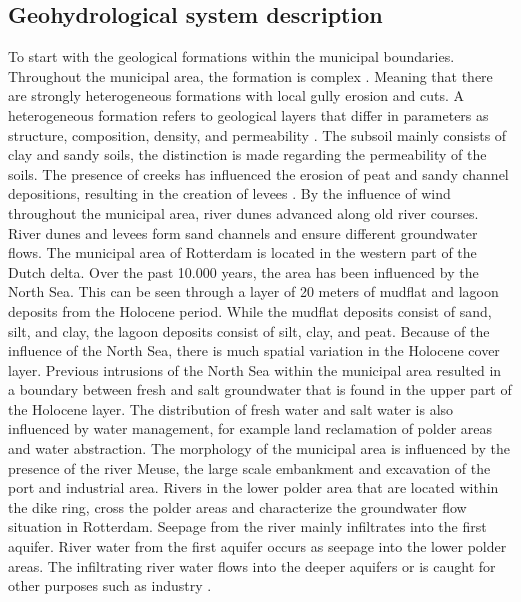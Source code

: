 \subsection{Geohydrological system description}
To start with the geological formations within the municipal boundaries. Throughout the municipal area, the formation is complex \cite{valstar-2019}. Meaning that there are strongly heterogeneous formations with local gully erosion and cuts. A heterogeneous formation refers to geological layers that differ in parameters as structure, composition, density, and permeability \cite{valstar-2019}. The subsoil mainly consists of clay and sandy soils, the distinction is made regarding the permeability of the soils. The presence of creeks has influenced the erosion of peat and sandy channel depositions, resulting in the creation of levees \cite{janssen-2005}. By the influence of wind throughout the municipal area, river dunes advanced along old river courses. River dunes and levees form sand channels and ensure different groundwater flows. 
The municipal area of Rotterdam is located in the western part of the Dutch delta. Over the past 10.000 years, the area has been influenced by the North Sea. This can be seen through a layer of 20 meters of mudflat and lagoon deposits from the Holocene period. While the mudflat deposits consist of sand, silt, and clay, the lagoon deposits consist of silt, clay, and peat. Because of the influence of the North Sea, there is much spatial variation in the Holocene cover layer. Previous intrusions of the North Sea within the municipal area resulted in a boundary between fresh and salt groundwater that is found in the upper part of the Holocene layer. The distribution of fresh water and salt water is also influenced by water management, for example land reclamation of polder areas and water abstraction. The morphology of the municipal area is influenced by the presence of the river Meuse, the large scale embankment and excavation of the port and industrial area. Rivers in the lower polder area that are located within the dike ring, cross the polder areas and characterize the groundwater flow situation in Rotterdam. Seepage from the river mainly infiltrates into the first aquifer. River water from the first aquifer occurs as seepage into the lower polder areas. The infiltrating river water flows into the deeper aquifers or is caught for other purposes such as industry \cite{janssen-2005}. \\
